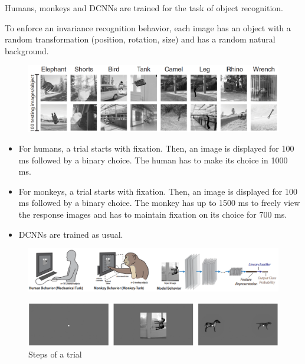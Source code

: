 \begin{casestudy}
    Humans, monkeys and DCNNs are trained for the task of object recognition.

    To enforce an invariance recognition behavior, each image has an object with a random transformation (position, rotation, size)
    and has a random natural background.

    \begin{figure}[H]
        \centering
        \includegraphics[width=0.65\linewidth]{./img/human_dcnn_divergence3.png}
    \end{figure}

    \begin{itemize}
        \item For humans, a trial starts with fixation. Then, an image is displayed for 100 ms followed by a binary choice.
            The human has to make its choice in 1000 ms.
    
        \item For monkeys, a trial starts with fixation. Then, an image is displayed for 100 ms followed by a binary choice.
            The monkey has up to 1500 ms to freely view the response images and has to maintain fixation on its choice for 700 ms.
        
        \item DCNNs are trained as usual.
    \end{itemize}

    \begin{figure}[H]
        \centering
        \includegraphics[width=0.85\linewidth]{./img/human_dcnn_divergence1.png}
    \end{figure}

    \begin{figure}[H]
        \centering
        \includegraphics[width=0.7\linewidth]{./img/human_dcnn_divergence2.png}
        \caption{Steps of a trial}
    \end{figure}


\end{casestudy}
